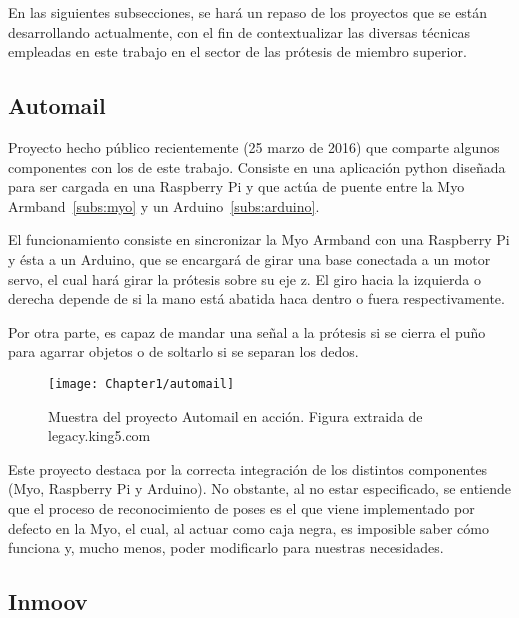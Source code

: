 En las siguientes subsecciones, se hará un repaso de los proyectos que se
están desarrollando actualmente, con el fin de contextualizar las diversas
técnicas empleadas en este trabajo en el sector de las prótesis de miembro
superior.


\subsection{Automail}
\label{sub:automail}

Proyecto hecho público recientemente \cite{enable-myo} (25 marzo de 2016)
que comparte algunos componentes con los de este trabajo. Consiste en una
aplicación python diseñada para ser cargada en una Raspberry Pi \cite{raspberry-pi}
y que actúa de puente entre la Myo Armband~\ref{subs:myo} y un Arduino~\ref{subs:arduino}.

El funcionamiento \cite{automail} consiste en sincronizar la Myo Armband con una Raspberry Pi y
ésta a un Arduino, que se encargará de girar una base conectada a un motor
servo, el cual hará girar la prótesis sobre su eje z. El giro hacia la izquierda
o derecha depende de si la mano está abatida haca dentro o fuera
respectivamente.

Por otra parte, es capaz de mandar una señal a la prótesis si se cierra el puño
para agarrar objetos o de soltarlo si se separan los dedos.

\begin{figure}[h]
    \centering
    \texttt{[image: Chapter1/automail]}


\caption{Muestra del proyecto Automail en acción. Figura extraida de legacy.king5.com}
\label{fig:automail}
\end{figure}


Este proyecto destaca por la correcta integración de los distintos
componentes (Myo, Raspberry Pi y Arduino). No obstante, al no estar
especificado,
se entiende que el proceso de reconocimiento de poses es el que viene
implementado por defecto en la Myo, el cual, al actuar como caja negra, es
imposible saber cómo funciona y, mucho menos, poder modificarlo para nuestras
necesidades.



\subsection{Inmoov}
\label{subs:inmoov}

